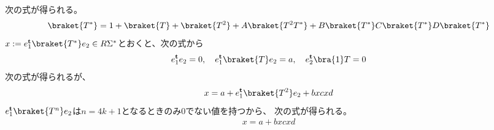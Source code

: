 {	次の式が得られる。
	\begin{equation*}\begin{split}
		\braket{T^*} = 1 + \braket{T} + \braket{T^2} + A\braket{T^2T^*} 
		+ B\braket{T^*}C\braket{T^*}D\braket{T^*}
	\end{split}\end{equation*}
	$x:=e_1^\tran\braket{T^*}e_2\in R\Sigma^*$とおくと、次の式から
	\begin{equation*}\begin{split}
		e_1^\tran e_2 = 0,\quad e_1^\tran\braket{T}e_2 = a
		,\quad e_2^\tran\bra{1}T = 0
	\end{split}\end{equation*}
	次の式が得られるが、
	\begin{equation*}\begin{split}
		x = a + e_1^\tran\braket{T^2}e_2 + bxcxd
	\end{split}\end{equation*}
	$e_1^\tran\braket{T^n}e_2$は$n=4k+1$となるときのみ$0$でない値を持つから、
	次の式が得られる。
	\begin{equation}\label{eq:冗長なDyck言語の列挙}\begin{split}
		x = a + bxcxd
	\end{split}\end{equation}

}
